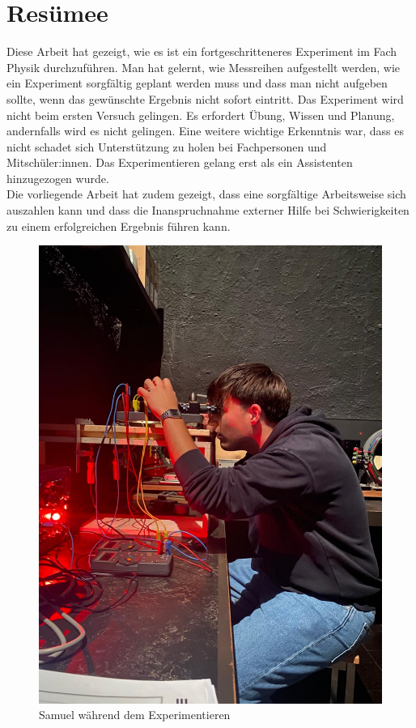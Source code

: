 \section{Resümee}\label{sec:resumee}
Diese Arbeit hat gezeigt, wie es ist ein fortgeschritteneres Experiment im Fach Physik durchzuführen. Man hat gelernt, wie Messreihen aufgestellt werden, wie ein Experiment sorgfältig geplant werden muss und dass man nicht aufgeben sollte, wenn das gewünschte Ergebnis nicht sofort eintritt. Das Experiment wird nicht beim ersten Versuch gelingen. Es erfordert Übung, Wissen und Planung, andernfalls wird es nicht gelingen. Eine weitere wichtige Erkenntnis war, dass es nicht schadet sich Unterstützung zu holen bei Fachpersonen und Mitschüler:innen. Das Experimentieren gelang erst als ein Assistenten hinzugezogen wurde. \\

\noindent Die vorliegende Arbeit hat zudem gezeigt, dass eine sorgfältige Arbeitsweise sich auszahlen kann und dass die Inanspruchnahme externer Hilfe bei Schwierigkeiten zu einem erfolgreichen Ergebnis führen kann.

\begin{figure}[h]
	\centering
	\includegraphics[scale=0.25]{bilder/pdf/bildExperimentieren.pdf}
	\caption{Samuel während dem Experimentieren}
	\label{fig:experimentieren}
\end{figure}